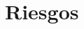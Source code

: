 \documentclass[a4paper, 10pt, oneside]{book}
\begin{document}
    \section{Riesgos}\label{sec:riesgos}


\end{document}
